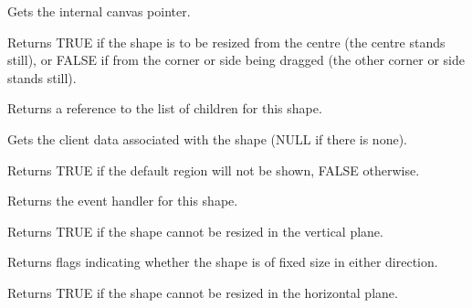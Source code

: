 

Gets the internal canvas pointer.



Returns TRUE if the shape is to be resized from the centre (the centre
stands still), or FALSE if from the corner or side being dragged (the
other corner or side stands still).



Returns a reference to the list of children for this shape.



Gets the client data associated with the shape (NULL if there is
none).



Returns TRUE if the default region will not be shown, FALSE otherwise.



Returns the event handler for this shape.



Returns TRUE if the shape cannot be resized in the vertical plane.



Returns flags indicating whether the shape is of fixed size in either direction.



Returns TRUE if the shape cannot be resized in the horizontal plane.


